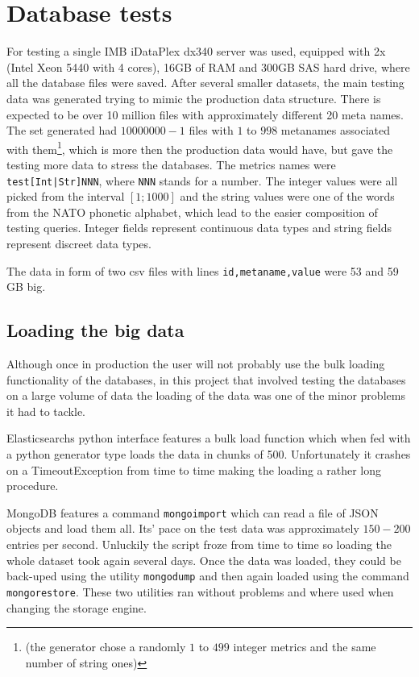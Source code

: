 
\section{Database tests}

For testing a single IMB iDataPlex dx340 server was used, equipped with 2x (Intel Xeon 5440 with 4 cores), 16GB
of RAM and 300GB SAS hard drive, where all the database files were saved. After several smaller datasets, 
the main testing data was generated trying to mimic the production data structure. There is expected to
be over 10 million files with approximately different 20 meta names. %
The set generated had $10 000 000 - 1$ files with $1$ to $998$ metanames associated with them\footnote{ 
(the generator chose a randomly $1$ to $499$ integer metrics and the same number of string ones)}, which is more
then the production data would have, but gave the testing more data to stress the databases.
The metrics names were \texttt{test[Int|Str]NNN}, where \texttt{NNN} stands for a number. The
integer values were all picked from the interval $[1;1000]$ and the string values were one of the
words from the NATO phonetic alphabet\cite{NATO}, which lead to the easier composition of testing queries. 
Integer fields represent continuous data types and string fields represent discreet data types.

The data in form of two csv files with lines \texttt{id,metaname,value} were 53 and 59 GB big.

\subsection{Loading the big data}

Although once in production the user will not probably use the bulk loading functionality of the databases, in
this project that involved testing the databases on a large volume of data the loading of the data was one 
of the minor problems it had to tackle.

Elasticsearchs python interface features a bulk load function which when fed with a python generator type
loads the data in chunks of 500. Unfortunately it crashes on a TimeoutException from time to 
time making the loading a rather long procedure. 

MongoDB features a command \texttt{mongoimport} which can read a file of JSON objects and load
them all. Its' pace on the test data was approximately $150-200$ entries per second. Unluckily 
the script froze from time to time so loading the whole dataset took again several days. Once the data was
loaded, they could be back-uped using the utility \texttt{mongodump} and then again loaded using the 
command \texttt{mongorestore}. These two utilities ran without problems and where used when changing the 
storage engine.

